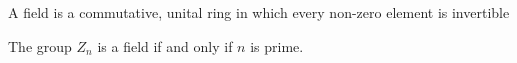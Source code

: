 \begin{definition}
	A field is a commutative, unital ring in which every non-zero element is invertible
\end{definition}
The group $Z_n$ is a field if and only if $n$ is prime.
